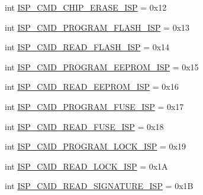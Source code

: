 \begin{DoxyCompactItemize}
\item 
int \hyperlink{classsoftware_1_1chipwhisperer_1_1hardware_1_1naeusb_1_1programmer__avr_1_1AVRISP_a619973473cbbfaaed1f11b46c9e1db83}{I\+S\+P\+\_\+\+C\+M\+D\+\_\+\+C\+H\+I\+P\+\_\+\+E\+R\+A\+S\+E\+\_\+\+I\+S\+P} = 0x12
\item 
int \hyperlink{classsoftware_1_1chipwhisperer_1_1hardware_1_1naeusb_1_1programmer__avr_1_1AVRISP_adafb34c4319e15d0feb0c86f77464c0d}{I\+S\+P\+\_\+\+C\+M\+D\+\_\+\+P\+R\+O\+G\+R\+A\+M\+\_\+\+F\+L\+A\+S\+H\+\_\+\+I\+S\+P} = 0x13
\item 
int \hyperlink{classsoftware_1_1chipwhisperer_1_1hardware_1_1naeusb_1_1programmer__avr_1_1AVRISP_a11926590275da564a7f7a9c67fb9c4b5}{I\+S\+P\+\_\+\+C\+M\+D\+\_\+\+R\+E\+A\+D\+\_\+\+F\+L\+A\+S\+H\+\_\+\+I\+S\+P} = 0x14
\item 
int \hyperlink{classsoftware_1_1chipwhisperer_1_1hardware_1_1naeusb_1_1programmer__avr_1_1AVRISP_a86283abf1e7a463bb7037118ba96523a}{I\+S\+P\+\_\+\+C\+M\+D\+\_\+\+P\+R\+O\+G\+R\+A\+M\+\_\+\+E\+E\+P\+R\+O\+M\+\_\+\+I\+S\+P} = 0x15
\item 
int \hyperlink{classsoftware_1_1chipwhisperer_1_1hardware_1_1naeusb_1_1programmer__avr_1_1AVRISP_a3c82b943016436def5f21a3ceacfce49}{I\+S\+P\+\_\+\+C\+M\+D\+\_\+\+R\+E\+A\+D\+\_\+\+E\+E\+P\+R\+O\+M\+\_\+\+I\+S\+P} = 0x16
\item 
int \hyperlink{classsoftware_1_1chipwhisperer_1_1hardware_1_1naeusb_1_1programmer__avr_1_1AVRISP_a4721a0a7e1ed28046f6547ae99a0358b}{I\+S\+P\+\_\+\+C\+M\+D\+\_\+\+P\+R\+O\+G\+R\+A\+M\+\_\+\+F\+U\+S\+E\+\_\+\+I\+S\+P} = 0x17
\item 
int \hyperlink{classsoftware_1_1chipwhisperer_1_1hardware_1_1naeusb_1_1programmer__avr_1_1AVRISP_a4341e5b7244a4ea44797d0b0ed6b16e6}{I\+S\+P\+\_\+\+C\+M\+D\+\_\+\+R\+E\+A\+D\+\_\+\+F\+U\+S\+E\+\_\+\+I\+S\+P} = 0x18
\item 
int \hyperlink{classsoftware_1_1chipwhisperer_1_1hardware_1_1naeusb_1_1programmer__avr_1_1AVRISP_a8d3bf3e15dfc2d6f8309bb28f1f0e9a1}{I\+S\+P\+\_\+\+C\+M\+D\+\_\+\+P\+R\+O\+G\+R\+A\+M\+\_\+\+L\+O\+C\+K\+\_\+\+I\+S\+P} = 0x19
\item 
int \hyperlink{classsoftware_1_1chipwhisperer_1_1hardware_1_1naeusb_1_1programmer__avr_1_1AVRISP_aabdf83b268b72480d60379c2f9936a50}{I\+S\+P\+\_\+\+C\+M\+D\+\_\+\+R\+E\+A\+D\+\_\+\+L\+O\+C\+K\+\_\+\+I\+S\+P} = 0x1\+A
\item 
int \hyperlink{classsoftware_1_1chipwhisperer_1_1hardware_1_1naeusb_1_1programmer__avr_1_1AVRISP_a2d857e4b5ae26fd8bd1fba554fa1e856}{I\+S\+P\+\_\+\+C\+M\+D\+\_\+\+R\+E\+A\+D\+\_\+\+S\+I\+G\+N\+A\+T\+U\+R\+E\+\_\+\+I\+S\+P} = 0x1\+B

\end{DoxyCompactItemize}
